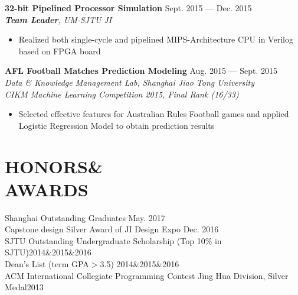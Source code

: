 \documentclass[margin,line,letterpaper]{res}
\begin{document}
\begin{resume}
{
\small
{\bf 32-bit Pipelined Processor Simulation} \hfill Sept. 2015 --- Dec. 2015\\
{\it \textbf{Team Leader}, UM-SJTU JI}
}
\begin{itemize}
\setlength{\itemsep}{0pt}
\setlength{\parskip}{0pt}
\setlength{\parsep}{0pt}
\item {\small Realized both single-cycle and pipelined MIPS-Architecture CPU in Verilog based on FPGA board}
\end{itemize}
\vspace{-.1 in}
{
\small
{\bf AFL Football Matches Prediction Modeling} \hfill Aug. 2015 --- Sept. 2015\\
{\it Data \& Knowledge Management Lab, Shanghai Jiao Tong University \\ CIKM Machine Learning Competition 2015, Final Rank (16/33)}
}
\begin{itemize}
\setlength{\itemsep}{0pt}
\setlength{\parskip}{0pt}
\setlength{\parsep}{0pt}
\item {\small Selected effective features for Australian Rules Football games and applied Logistic Regression Model to obtain prediction results}
\end{itemize}
\vspace{-.1 in}
\section{HONORS\&\\AWARDS}
{
\small
Shanghai Outstanding Graduates \hfill May. 2017\\
Capstone design Silver Award of JI Design Expo \hfill Dec. 2016\\
SJTU Outstanding Undergraduate Scholarship {(Top 10\% in SJTU)}\hfill2014\&2015\&2016\\
Dean's List {(term GPA$>$3.5)} \hfill2014\&2015\&2016\\
ACM International Collegiate Programming Contest Jing Hua Division, Silver Medal\hfill 2013\\
}



\end{resume}
\end{document}
